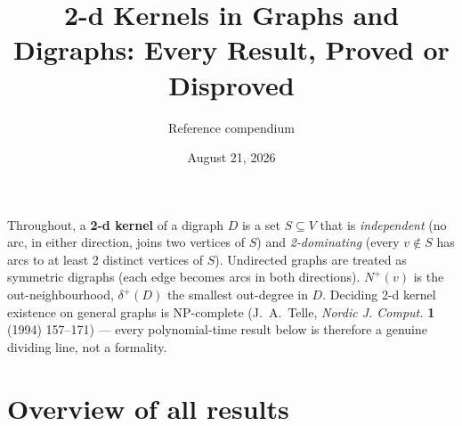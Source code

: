 \documentclass[11pt]{article}
\title{2-d Kernels in Graphs and Digraphs: Every Result, Proved or Disproved}
\author{Reference compendium}
\date{August 21, 2026}
\theoremstyle{plain}
\theoremstyle{definition}
\theoremstyle{remark}
\begin{document}
\maketitle
\vspace{-1.5em}

Throughout, a \textbf{2-d kernel} of a digraph $D$ is a set $S \subseteq V$ that is
\emph{independent} (no arc, in either direction, joins two vertices of $S$) and
\emph{2-dominating} (every $v \notin S$ has arcs to at least 2 distinct vertices of
$S$). Undirected graphs are treated as symmetric digraphs (each edge becomes arcs in
both directions). $N^+(v)$ is the out-neighbourhood, $\delta^+(D)$ the smallest
out-degree in $D$. Deciding 2-d kernel existence on general graphs is NP-complete
(J.~A.~Telle, \emph{Nordic J. Comput.} \textbf{1} (1994) 157--171) — every
polynomial-time result below is therefore a genuine dividing line, not a formality.

\section*{Overview of all results}
\end{document}

